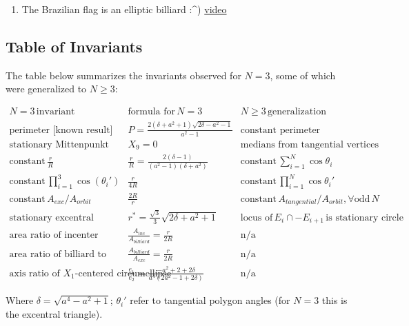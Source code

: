 \documentclass[]{article}
\providecommand{\tightlist}{%
  \setlength{\itemsep}{0pt}\setlength{\parskip}{0pt}}
\begin{document}
\begin{enumerate}
\def\labelenumi{\arabic{enumi}.}
\tightlist
\item
  The Brazilian flag is an elliptic billiard :\^{}) \href{https://www.youtube.com/watch?v=PHitZFbps8M}{video}
\end{enumerate}

\hypertarget{table-of-invariants}{%
\subsection{Table of Invariants}\label{table-of-invariants}}

The table below summarizes the invariants observed for \(N=3\), some of which were generalized to \(N\geq 3\):

\[
\begin{array}{r|l|l}
N=3\,\mbox{invariant}& \mbox{formula for}\,N=3 & N\geq3\,\mbox{generalization}  \\
\hline
\mbox{perimeter [known result]} & P=\frac{2(\delta+a^2+1)\sqrt{2\delta-a^2-1}}{a^2-1} & \mbox{constant perimeter} \\
\mbox{stationary Mittenpunkt} & X_9=0 & \mbox{medians from tangential vertices concur at origin} \\
\mbox{constant}\,\frac{r}{R} & \frac{r}{R}=\frac{2(\delta-1)}{(a^2-1)(\delta+a^2)} & \mbox{constant}\,\sum_{i=1}^N{\cos\theta_i} \\
\mbox{constant}\,\prod_{i=1}^{3}{\cos(\theta_i')} & \frac{r}{4R} & \mbox{constant}\,\prod_{i=1}^N{\cos\theta_i'} \\
\mbox{constant}\,A_{exc}/A_{orbit} & \frac{2R}{r} & \mbox{constant}\,A_{tangential}/A_{orbit},\forall\mbox{odd}\,N \\
\mbox{stationary excentral cosine circle} & r^*=\frac{\sqrt{3}}{3}\sqrt{2\delta+a^2+1} & \mbox{locus of}\,E_i\cap-E_{i+1}\,\mbox{is stationary circle} \\
\mbox{area ratio of incenter locus to billiard} & \frac{A_{inc}}{A_{billiard}} = \frac{r}{2R} & \mbox{n/a} \\
\mbox{area ratio of billiard to locus of excenters} & \frac{A_{billiard}}{A_{exc}} = \frac{r}{2R} & \mbox{n/a} \\
\mbox{axis ratio of }X_1\mbox{-centered circumellipse} & \frac{e_1}{e_2}=\frac{-a^2+2+2\delta}{a^4(2 a^2-1+2\delta)} & \mbox{n/a}
\end{array}
\]

Where \(\delta=\sqrt{a^4-a^2+1}\); \(\theta_i'\) refer to tangential polygon angles (for \(N=3\) this is the excentral triangle).
\end{document}
